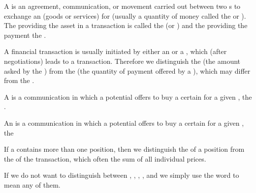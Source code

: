 \begin{module}[id=financial-transaction]
\begin{definition}
  A  is an agreement, communication, or movement carried out
  between two s to exchange an  (goods or
  services) for  (usually a quantity of money called the
   or ). The
   providing the asset in a transaction is called the
   (or ) and the 
  providing the payment the .
\end{definition}

A financial transaction is usually initiated by either an  or a ,
which (after negotiations) leads to a transaction.  Therefore we distinguish the
 (the amount asked by the ) from the
 (the quantity of payment offered by a ), which may differ
from the .

\begin{definition}[id=bid.def]
  A  is a communication in which a potential  offers to buy a
  certain  for a given , the .
\end{definition}

\begin{definition}[id=offer.def]
  An  is a communication in which a potential  offers to buy a
  certain  for a given , the 
\end{definition}

\begin{definition}
  If a  contains more than one position, then we distinguish
  the  of a position from the  of the
  transaction, which often the sum of all individual prices.
\end{definition}

\begin{definition}
  If we do not want to distinguish between , ,
  , , and  we
  simply use the word  to mean any of them.
\end{definition}

\end{module}


